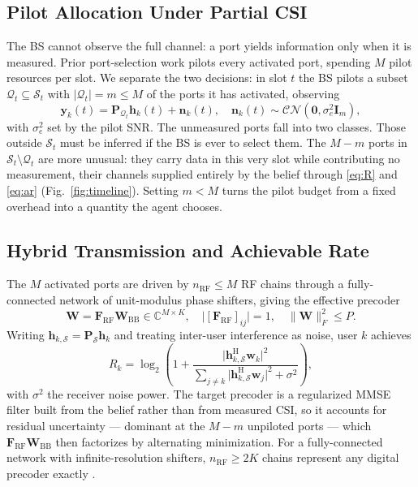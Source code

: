 \documentclass[journal]{IEEEtran}
\newcommand{\bh}{\mathbf{h}}
\newcommand{\bI}{\mathbf{I}}
\newcommand{\bW}{\mathbf{W}}
\newcommand{\bP}{\mathbf{P}}
\newcommand{\bF}{\mathbf{F}}
\newcommand{\by}{\mathbf{y}}
\newcommand{\bn}{\mathbf{n}}
\newcommand{\bw}{\mathbf{w}}
\newcommand{\CN}{\mathcal{CN}}
\newcommand{\bbC}{\mathbb{C}}
\begin{document}
\subsection{Pilot Allocation Under Partial CSI}
The BS cannot observe the full channel: a port yields information only when it
is measured. Prior port-selection work pilots every activated port, spending
$M$ pilot resources per slot. We separate the two decisions: in slot $t$ the BS
pilots a subset $\mathcal{Q}_t\subseteq\mathcal{S}_t$ with
$|\mathcal{Q}_t|=m\le M$ of the ports it has activated, observing
\begin{equation}
  \by_k(t) = \bP_{\mathcal{Q}_t}\bh_k(t) + \bn_k(t),
  \quad
  \bn_k(t)\sim\CN(\mathbf{0},\sigma_e^2\bI_m),
  \label{eq:obs}
\end{equation}
with $\sigma_e^2$ set by the pilot SNR. The unmeasured ports fall into two
classes. Those outside $\mathcal{S}_t$ must be inferred if the BS is ever to
select them. The $M-m$ ports in
$\mathcal{S}_t\setminus\mathcal{Q}_t$ are more unusual: they carry data in this
very slot while contributing no measurement, their channels supplied entirely
by the belief through \eqref{eq:R} and \eqref{eq:ar}
(Fig.~\ref{fig:timeline}). Setting $m<M$ turns the pilot budget from a fixed
overhead into a quantity the agent chooses.

\subsection{Hybrid Transmission and Achievable Rate}
The $M$ activated ports are driven by $n_{\mathrm{RF}}\le M$ RF chains through
a fully-connected network of unit-modulus phase shifters, giving the effective
precoder
\begin{equation}
  \bW = \bF_{\mathrm{RF}}\bW_{\mathrm{BB}}\in\bbC^{M\times K},
  \quad
  \big|[\bF_{\mathrm{RF}}]_{ij}\big|=1,
  \quad
  \|\bW\|_F^2\le P .
  \label{eq:hybrid}
\end{equation}
Writing $\bh_{k,\mathcal{S}}=\bP_{\mathcal{S}}\bh_k$ and treating inter-user
interference as noise, user $k$ achieves
\begin{equation}
  R_k = \log_2\!\left(
    1+\frac{\big|\bh_{k,\mathcal{S}}^{\mathrm{H}}\bw_k\big|^2}
           {\sum_{j\neq k}\big|\bh_{k,\mathcal{S}}^{\mathrm{H}}\bw_j\big|^2+\sigma^2}
  \right),
  \label{eq:rate}
\end{equation}
with $\sigma^2$ the receiver noise power. The target precoder is a regularized
MMSE filter built from the belief rather than from measured CSI, so it accounts
for residual uncertainty --- dominant at the $M-m$ unpiloted ports --- which
$\bF_{\mathrm{RF}}\bW_{\mathrm{BB}}$ then factorizes by alternating
minimization. For a fully-connected network with infinite-resolution shifters,
$n_{\mathrm{RF}}\ge2K$ chains represent any digital precoder exactly
\cite{sohrabi2016hybrid,zhang2005variable}.
\end{document}

